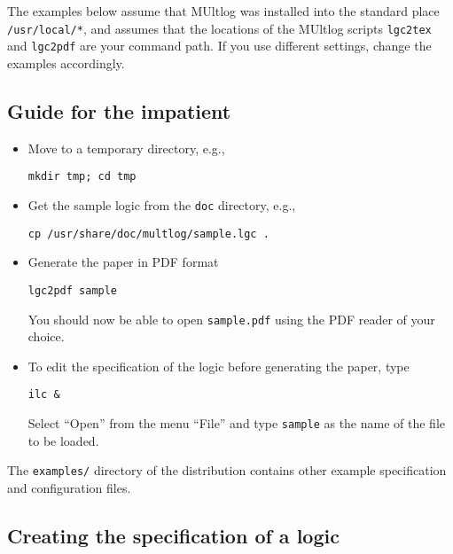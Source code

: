 \documentclass[
]{article}
\newcommand{\passthrough}[1]{#1}
\begin{document}
The examples below assume that MUltlog was installed into the standard
place \passthrough{\lstinline!/usr/local/*!}, and assumes that the
locations of the MUltlog scripts \passthrough{\lstinline!lgc2tex!} and
\passthrough{\lstinline!lgc2pdf!} are your command path. If you use
different settings, change the examples accordingly.

\hypertarget{guide-for-the-impatient}{%
\subsection{Guide for the impatient}\label{guide-for-the-impatient}}

\begin{itemize}
\item
  Move to a temporary directory, e.g.,

\begin{lstlisting}
mkdir tmp; cd tmp
\end{lstlisting}
\item
  Get the sample logic from the \passthrough{\lstinline!doc!} directory,
  e.g.,

\begin{lstlisting}
cp /usr/share/doc/multlog/sample.lgc .
\end{lstlisting}
\item
  Generate the paper in PDF format

\begin{lstlisting}
lgc2pdf sample
\end{lstlisting}

  You should now be able to open \passthrough{\lstinline!sample.pdf!}
  using the PDF reader of your choice.
\item
  To edit the specification of the logic before generating the paper,
  type

\begin{lstlisting}
ilc &
\end{lstlisting}

  Select ``Open'' from the menu ``File'' and type
  \passthrough{\lstinline!sample!} as the name of the file to be loaded.
\end{itemize}

The \passthrough{\lstinline!examples/!} directory of the distribution
contains other example specification and configuration files.

\hypertarget{creating-the-specification-of-a-logic}{%
\subsection{Creating the specification of a
logic}\label{creating-the-specification-of-a-logic}}
\end{document}
